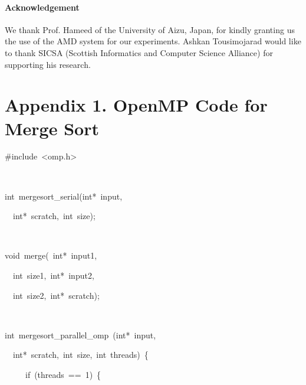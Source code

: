 \documentclass[copyright,creativecommons]{eptcs}
\newenvironment{lyxcode}
{\par\begin{list}{}{
\setlength{\rightmargin}{\leftmargin}
\setlength{\listparindent}{0pt}\raggedright
\setlength{\itemsep}{0pt}
\setlength{\parsep}{0pt}
\normalfont\ttfamily}\item[]}
{\end{list}}
\begin{document}
\paragraph*{Acknowledgement}

We thank Prof. Hameed of the University of Aizu, Japan, for kindly
granting us the use of the AMD system for our experiments. Ashkan
Tousimojarad would like to thank SICSA (Scottish Informatics and Computer
Science Alliance) for supporting his research.



\newpage{}


\section*{Appendix 1. OpenMP Code for Merge Sort }
\begin{lyxcode}


{\small }
\begin{algorithm}[H]
\begin{lyxcode}
\medskip{}


{\small \#include~<omp.h>}{\small \par}

{\small{}~}{\small \par}

{\small int~mergesort\_serial(int{*}~input,~}{\small \par}

{\small{}~~int{*}~scratch,~int~size);}{\small \par}

{\small{}~}{\small \par}

{\small void~merge(~int{*}~input1,~}{\small \par}

{\small{}~~int~size1,~int{*}~input2,~}{\small \par}

{\small{}~~int~size2,~int{*}~scratch);}{\small \par}

{\small{}~}{\small \par}

{\small int~mergesort\_parallel\_omp~(int{*}~input,~}{\small \par}

{\small{}~~int{*}~scratch,~int~size,~int~threads)~\{}{\small \par}

{\small{}~~~~~if~(threads~==~1)~\{}{\small \par}


\end{lyxcode}
\end{algorithm}
\end{lyxcode}
\end{document}
